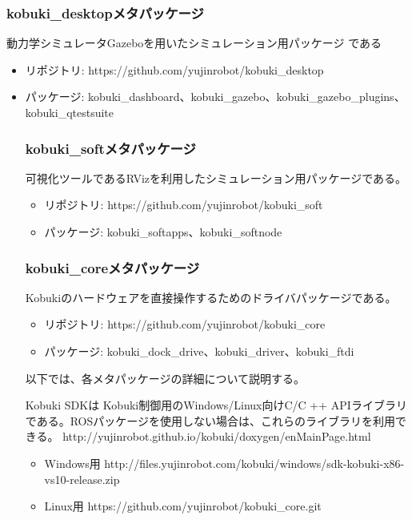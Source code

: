 \subsubsection{kobuki\_desktopメタパッケージ}

動力学シミュレータGazeboを用いたシミュレーション用パッケージ   である

\begin{itemize}
\item リポジトリ: https://github.com/yujinrobot/kobuki\_desktop
\item パッケージ: kobuki\_dashboard、kobuki\_gazebo、kobuki\_gazebo\_plugins、kobuki\_qtestsuite


\subsubsection{kobuki\_softメタパッケージ}

可視化ツールであるRVizを利用したシミュレーション用パッケージである。

\begin{itemize}
\item リポジトリ: https://github.com/yujinrobot/kobuki\_soft
\item パッケージ: kobuki\_softapps、kobuki\_softnode
\end{itemize}

\subsubsection{kobuki\_coreメタパッケージ}

Kobukiのハードウェアを直接操作するためのドライバパッケージである。

\begin{itemize}
\item リポジトリ: https://github.com/yujinrobot/kobuki\_core
\item パッケージ: kobuki\_dock\_drive、kobuki\_driver、kobuki\_ftdi
\end{itemize}

以下では、各メタパッケージの詳細について説明する。

\begin{exercise}
  Kobuki SDKは Kobuki制御用のWindows/Linux向けC/C ++ APIライブラリである。ROSパッケージを使用しない場合は、これらのライブラリを利用できる。
  http://yujinrobot.github.io/kobuki/doxygen/enMainPage.html

  \begin{itemize}
  \item Windows用
  http://files.yujinrobot.com/kobuki/windows/sdk-kobuki-x86-vs10-release.zip
  \item Linux用
  https://github.com/yujinrobot/kobuki\_core.git
  \end{itemize}
\end{exercise}


\end{itemize}
